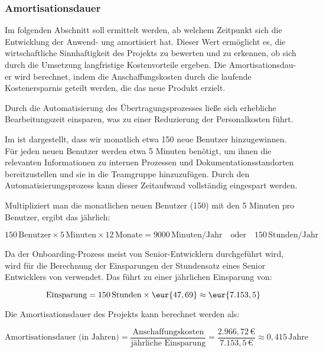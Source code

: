 
\subsubsection{Amortisationsdauer}
\label{sec:Amortisationsdauer}

Im folgenden Abschnitt soll ermittelt werden, ab welchem Zeitpunkt sich die Entwicklung der Anwend-
ung amortisiert hat. Dieser Wert ermöglicht es, die wirtschaftliche Sinnhaftigkeit des Projekts zu bewerten und zu erkennen, ob sich durch die Umsetzung langfristige Kostenvorteile ergeben. Die Amortisationsdau-
er wird berechnet, indem die Anschaffungskosten durch die laufende Kostenersparnis geteilt werden, die das neue Produkt erzielt. 

Durch die Automatisierung des Übertragungsprozesses ließe sich erhebliche Bearbeitungszeit einsparen, was zu einer Reduzierung der Personalkosten führt.

Im  ist dargestellt, dass wir monatlich etwa 150 neue Benutzer hinzugewinnen. Für jeden neuen Benutzer werden etwa 5 Minuten benötigt, um ihnen die relevanten Informationen zu internen Prozessen und Dokumentationsstandorten bereitzustellen und sie in die Teamgruppe hinzuzufügen. Durch den Automatisierungsprozess kann dieser Zeitaufwand vollständig eingespart werden.

Multipliziert man die monatlichen neuen Benutzer (150) mit den 5 Minuten pro Benutzer, ergibt das jährlich:

\[
150 \, \text{Benutzer} \times 5 \, \text{Minuten} \times 12 \, \text{Monate} = 9000 \, \text{Minuten/Jahr} \quad \text{oder} \quad 150 \, \text{Stunden/Jahr}
\]

Da der Onboarding-Prozess meist von Senior-Entwicklern durchgeführt wird, wird für die Berechnung der Einsparungen der Stundensatz eines Senior Entwicklers von  verwendet. Das führt zu einer jährlichen Einsparung von:

\[
\text{Einsparung} = 150 \, \text{Stunden} \times \eur{47,69} \approx \eur{7.153,5}
\]

Die Amortisationsdauer des Projekts kann berechnet werden als:

\[
\text{Amortisationsdauer (in Jahren)} = \frac{\text{Anschaffungskosten}}{\text{jährliche Einsparung}} = \frac{2.966,72 \, \text{€}}{7.153,5 \, \text{€}} \approx 0,415 \, \text{Jahre}
\]


